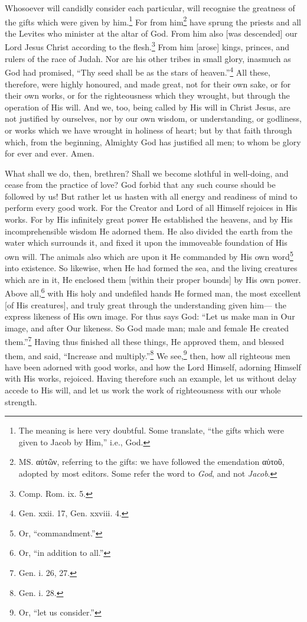 Whosoever will candidly consider each particular, will recognise the greatness of the gifts which were given by him.\footnote{The meaning is here very doubtful. Some translate, “the gifts which were given to Jacob by Him,” i.e., God.} For from him\footnote{\textsc{MS.} \textgreek{αὐτῶν}, referring to the gifts: we have followed the emendation \textgreek{αὐτοῦ}, adopted by most editors. Some refer the word to \emph{God}, and not \emph{Jacob}.} have sprung the priests and all the Levites who minister at the altar of God. From him also [was descended] our Lord Jesus Christ according to the flesh.\footnote{Comp. Rom. ix. 5.} From him [arose] kings, princes, and rulers of the race of Judah. Nor are his other tribes in small glory, inasmuch as God had promised, “Thy seed shall be as the stars of heaven.”\footnote{Gen. xxii. 17, Gen. xxviii. 4.} All these, therefore, were highly honoured, and made great, not for their own sake, or for their own works, or for the righteousness which they wrought, but through the operation of His will. And we, too, being called by His will in Christ Jesus, are not justified by ourselves, nor by our own wisdom, or understanding, or godliness, or works which we have wrought in holiness of heart; but by that faith through which, from the beginning, Almighty God has justified all men; to whom be glory for ever and ever. Amen.


What shall we do, then, brethren? Shall we become slothful in well-doing, and cease from the practice of love? God forbid that any such course should be followed by us! But rather let us hasten with all energy and readiness of mind to perform every good work. For the Creator and Lord of all Himself rejoices in His works. For by His infinitely great power He established the heavens, and by His incomprehensible wisdom He adorned them. He also divided the earth from the water which surrounds it, and fixed it upon the immoveable foundation of His own will. The animals also which are upon it He commanded by His own word\footnote{Or, “commandment.”} into existence. So likewise, when He had formed the sea, and the living creatures which are in it, He enclosed them [within their proper bounds] by His own power. Above all,\footnote{Or, “in addition to all.”} with His holy and undefiled hands He formed man, the most excellent [of His creatures], and truly great through the understanding given him— the express likeness of His own image. For  thus says God: “Let us make man in Our image, and after Our likeness. So God made man; male and female He created them.”\footnote{Gen. i. 26, 27.} Having thus finished all these things, He approved them, and blessed them, and said, “Increase and multiply.”\footnote{Gen. i. 28.} We see,\footnote{Or, “let us consider.”} then, how all righteous men have been adorned with good works, and how the Lord Himself, adorning Himself with His works, rejoiced. Having therefore such an example, let us without delay accede to His will, and let us work the work of righteousness with our whole strength.

